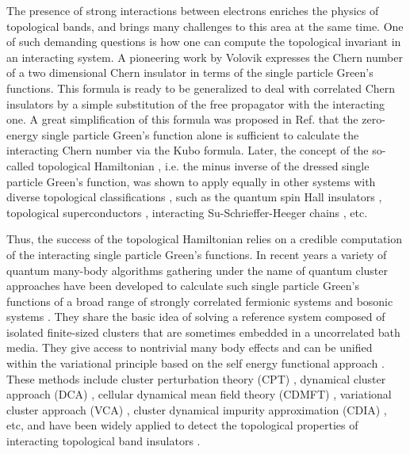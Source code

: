 \documentclass[12pt]{iopart}
\begin{document}
\par The presence of strong interactions between electrons enriches the physics of topological bands, and brings many challenges to this area at the same time. One of such demanding questions is how one can compute the topological invariant in an interacting system. A pioneering work by Volovik \cite{V2003} expresses the Chern number \cite{TKNN_PRL1982} of a two dimensional Chern insulator in terms of the single particle Green's functions. This formula is ready to be generalized to deal with correlated Chern insulators by a simple substitution of the free propagator with the interacting one. A great simplification of this formula was proposed in Ref. \cite{WZ_PRX2012} that the zero-energy single particle Green's function alone is sufficient to calculate the interacting Chern number via the Kubo formula. Later, the concept of the so-called topological Hamiltonian \cite{WY_JPCM2013}, i.e. the minus inverse of the dressed single particle Green's function, was shown to apply equally in other systems with diverse topological classifications \cite{WA_PRB2013,LEGW_PRB2013,GMCBB_NJP2015,LS_PRB2018,SK_PRB2018}, such as the quantum spin Hall insulators \cite{LEGW_PRB2013,GMCBB_NJP2015}, topological superconductors \cite{LS_PRB2018}, interacting Su-Schrieffer-Heeger chains \cite{SK_PRB2018}, etc.

\par Thus, the success of the topological Hamiltonian relies on a credible computation of the interacting single particle Green's functions. In recent years a variety of quantum many-body algorithms gathering under the name of quantum cluster approaches \cite{MJPH_RMP2005,S_arXiv2008} have been developed to calculate such single particle Green's functions of a broad range of strongly correlated fermionic systems \cite{SPP_PRL2000,HMJK_PRB2000,KSPB_PRL2001,PAD_PRL2003,ST_PRL2004,BKSTP_EPL2009,KYXL_PRB2011,YXL_PRL2011,YL_PRB2012,LYXL_PRB2014} and bosonic systems \cite{KD_JPCM2006,KAL_PRB2011,YWDYL_PRB2018}. They share the basic idea of solving a reference system composed of isolated finite-sized clusters that are sometimes embedded in a uncorrelated bath media. They give access to nontrivial many body effects and can be unified within the variational principle based on the self energy functional approach \cite{P_EPJB2003}. These methods include cluster perturbation theory (CPT) \cite{SPP_PRL2000}, dynamical cluster approach (DCA) \cite{HMJK_PRB2000}, cellular dynamical mean field theory (CDMFT) \cite{KSPB_PRL2001}, variational cluster approach (VCA) \cite{PAD_PRL2003}, cluster dynamical impurity approximation (CDIA) \cite{BKSTP_EPL2009}, etc, and have been widely applied to detect the topological properties of interacting topological band insulators \cite{YXL_PRL2011,GMCBB_NJP2015,WFSM_PRB2016,LS_PRB2018}.
\end{document}
